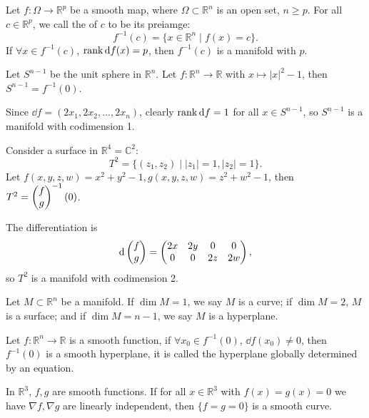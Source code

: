 \begin{corollary}
    Let $f: \Omega \to \mathbb{R}^{p}$ be a smooth map, where
	$\Omega \subset \mathbb{R}^{n}$ is an open set, $n\ge p$.
	For all $c\in \mathbb{R}^{p}$, we call the  of
	$c$ to be its preiamge:
	\[
	f^{-1}(c) = \{x\in \mathbb{R}^{n} \mid f(x) = c\}.
	\]
	If $\forall x\in f^{-1}(c)$, $\operatorname{rank} \mathop{}\!\mathrm{d} f(x) = p$,
	then $f^{-1}(c)$ is a manifold with  $p$.
\end{corollary}

\begin{example}
    Let $S^{n-1}$ be the unit sphere in $\mathbb{R}^{n}$.
	Let $f: \mathbb{R}^{n}\to \mathbb{R}$ with $x\mapsto |x|^2 - 1$,
	then $S^{n-1} = f^{-1}(0)$.

	Since $\dd f = (2x_1, 2x_2, \dots, 2x_n)$, clearly $\operatorname{rank} \mathop{}\!\mathrm{d} f = 1$ for
	all $x\in S^{n-1}$, so $S^{n-1}$ is a manifold with codimension 1.
\end{example}
\begin{example}
    Consider a surface in $\mathbb{R}^{4} = \mathbb{C}^2$:
	\[
	T^2 = \{(z_1, z_2)\mid |z_1| = 1, |z_2| = 1\}.
	\]
	Let $f(x,y,z,w) = x^2+y^2-1, g(x,y,z,w) = z^2+w^2-1$,
	then $T^2 = \begin{pmatrix} f\\g \end{pmatrix}^{-1}(0)$.

	The differentiation is
	\[
	\mathop{}\!\mathrm{d} \begin{pmatrix} f\\g \end{pmatrix} = \begin{pmatrix}
		2x &2y &0 &0 \\ 0 &0 &2z &2w
	\end{pmatrix},
	\]
	so $T^2$ is a manifold with codimension 2.
\end{example}

\begin{definition}
	Let $M \subset \mathbb{R}^{n}$ be a manifold. If $\dim M = 1$,
	we say $M$ is a curve; if $\dim M = 2$, $M$ is a surface;
	and if $\dim M = n-1$, we say $M$ is a hyperplane.
\end{definition}

\begin{lemma}
	Let $f: \mathbb{R}^{n}\to \mathbb{R}$ is a smooth function,
	if $\forall x_0\in f^{-1}(0)$, $\dd f(x_0)\ne 0$,
	then $f^{-1}(0)$ is a smooth hyperplane, it is called the
	hyperplane globally determined by an equation.
\end{lemma}
\begin{example}
    In $\mathbb{R}^{3}$, $f,g$ are smooth functions.
	If for all $x\in \mathbb{R}^{3}$ with $f(x) = g(x) = 0$ we have
	$\nabla f, \nabla g$ are linearly independent,
	then $\{f = g = 0\}$ is a smooth curve.
\end{example}
